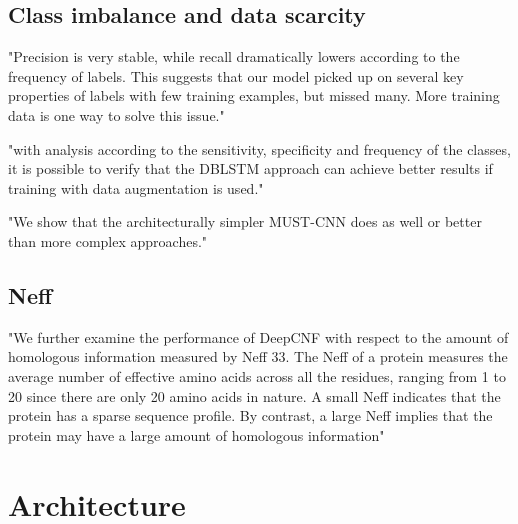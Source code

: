 \documentclass[]{scrartcl}
\begin{document}
\subsection{Class imbalance and data scarcity}
"Precision is very stable, while recall dramatically lowers according to the frequency of labels. This suggests that our model picked up on several key properties of labels with few training examples, but missed many. More training data is one way to solve this issue." \cite{Lin2016}

"with analysis according to the sensitivity, specificity and frequency of the classes, it is possible to verify that the DBLSTM approach can achieve better results if training with data augmentation is used." \cite{Hattori2017}

"We show that the architecturally simpler MUST-CNN does as well or better than more complex approaches." \cite{Lin2016}

\subsection{Neff}
"We further examine the performance of DeepCNF with respect to the amount of homologous information measured by Neff 33. The Neff of a protein measures the average number of effective amino acids across all the residues, ranging from 1 to 20 since there are only 20 amino acids in nature. A small Neff indicates that the protein has a sparse sequence profile. By contrast, a large Neff implies that the protein may have a large amount of homologous information" \cite{Wang2016}


\section{Architecture}
\end{document}
